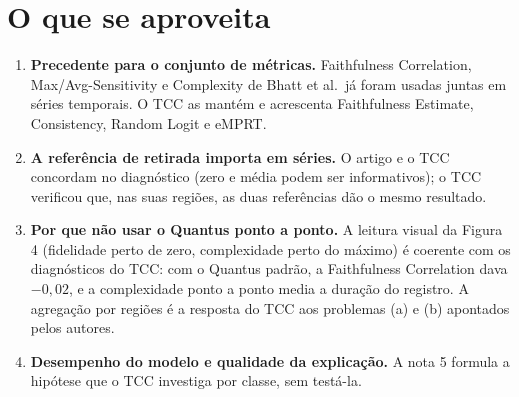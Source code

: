 \documentclass[11pt,a4paper]{article}
\begin{document}
\section{O que se aproveita}
\begin{enumerate}
\item \textbf{Precedente para o conjunto de métricas.} Faithfulness Correlation, Max/Avg-Sensitivity e Complexity de Bhatt et al.\ já foram usadas juntas em séries temporais. O TCC as mantém e acrescenta Faithfulness Estimate, Consistency, Random Logit e eMPRT.
\item \textbf{A referência de retirada importa em séries.} O artigo e o TCC concordam no diagnóstico (zero e média podem ser informativos); o TCC verificou que, nas suas regiões, as duas referências dão o mesmo resultado.
\item \textbf{Por que não usar o Quantus ponto a ponto.} A leitura visual da Figura 4 (fidelidade perto de zero, complexidade perto do máximo) é coerente com os diagnósticos do TCC: com o Quantus padrão, a Faithfulness Correlation dava $-0{,}02$, e a complexidade ponto a ponto media a duração do registro. A agregação por regiões é a resposta do TCC aos problemas (a) e (b) apontados pelos autores.
\item \textbf{Desempenho do modelo e qualidade da explicação.} A nota 5 formula a hipótese que o TCC investiga por classe, sem testá-la.
\end{enumerate}
\end{document}
